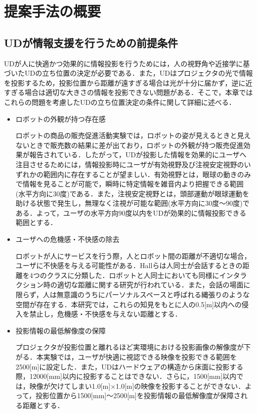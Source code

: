 \documentclass[12pt]{sonota/aislab}
\begin{document}
\section{提案手法の概要}
\subsection{UDが情報支援を行うための前提条件}\label{投影支援条件}
UDが人に快適かつ効果的に情報投影を行うためには，人の視野角や近接学に基づいたUDの立ち位置の決定が必要である．また，UDはプロジェクタの光で情報を投影するため，投影位置から距離が遠すぎる場合は光が十分に届かず，逆に近すぎる場合は適切な大きさの情報を投影できない問題がある．そこで，本章ではこれらの問題を考慮したUDの立ち位置決定の条件に関して詳細に述べる．

\begin{itemize}
 \item ロボットの外観が持つ存在感
    
    ロボットの商品の販売促進活動実験\cite{販売促進}では，ロボットの姿が見えるときと見えないときで販売数の結果に差が出ており，ロボットの外観が持つ販売促進効果が報告されている．したがって，UDが投影した情報を効果的にユーザへ注目させるためには，情報投影時にユーザが有効視野及び注視安定視野のいずれかの範囲内に存在することが望ましい．有効視野とは，眼球の動きのみで情報を見ることが可能で，瞬時に特定情報を雑音内より把握できる範囲(水平方向に30度)である．また，注視安定視野とは，頭部運動が眼球運動を助ける状態で発生し，無理なく注視が可能な範囲(水平方向に30度〜90度)である．よって，ユーザの水平方向90度以内をUDが効果的に情報投影できる範囲とする．
    
 \item ユーザへの危機感・不快感の除去
 
    ロボットが人にサービスを行う際，人とロボット間の距離が不適切な場合，ユーザに不快感を与える可能性がある．Hallらは人同士が会話するときの距離を4つのクラスに分類した\cite{Hall}．ロボットと人同士においても同様にインタラクション時の適切な距離に関する研究が行われている\cite{proximity}．また，会話の場面に限らず，人は無意識のうちにパーソナルスペースと呼ばれる縄張りのような空間が存在する．本研究では，これらの知見をもとに人の0.5[m]以内への侵入を禁止し，危機感・不快感を与えない距離とする．
 
 \item 投影情報の最低解像度の保障
 
    プロジェクタが投影位置と離れるほど実環境における投影画像の解像度が下がる．本実験では，ユーザが快適に視認できる映像を投影できる範囲を2500[m]に設定した．また，UDはハードウェアの構造から床面に投影する際，12000[mm]以内に投影することはできない．さらに，1500[mm]以内では，映像が欠けてしまい1.0[m]×1.0[m]の映像を投影することができない．よって，投影位置から1500[mm]〜2500[m]を投影情報の最低解像度が保障される距離とする．
\end{itemize}
\end{document}
